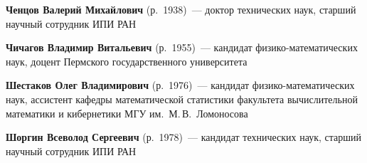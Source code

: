 \begin{multicols}{2}
\vspace*{6pt}

\noindent
\textbf{Ченцов Валерий Михайлович} (р.\ 1938)~---  доктор технических наук, старший 
научный сотрудник ИПИ РАН

\vspace*{6pt}

\noindent
\textbf{Чичагов Владимир Витальевич} (р.\ 1955)~---  кандидат физико-математических 
наук, доцент Пермского государственного университета

\vspace*{6pt}

\noindent
\textbf{Шестаков Олег Владимирович} (р.\ 1976)~---  кандидат физико-математических 
наук, ассистент ка\-фед\-ры математической статистики факультета вы\-чис\-ли\-тель\-ной 
математики и кибернетики МГУ им.\ М.\,В.~Ломоносова

\vspace*{6pt}

\noindent
\textbf{Шоргин Всеволод Сергеевич} (р.\ 1978)~--- кандидат технических наук, старший 
научный сотрудник ИПИ РАН

\noindent
\end{multicols}